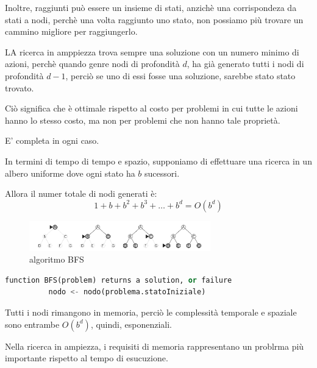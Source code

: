\documentclass[a4paper, 12pt]{book}
\begin{document}
    Inoltre, raggiunti può essere un insieme di stati, anzichè una corrispondeza da stati a nodi, perchè una volta raggiunto uno stato, non possiamo più trovare un cammino migliore per raggiungerlo.

    LA ricerca in amppiezza trova sempre una soluzione con un numero minimo di azioni, perchè quando genre nodi di profondità $d$, ha già generato tutti i nodi di profondità $d - 1$, perciò se uno di essi fosse una soluzione, sarebbe stato stato trovato.

    Ciò significa che è ottimale rispetto al costo per problemi in cui tutte le azioni hanno lo stesso costo, ma non per problemi che non hanno tale proprietà.

    E' completa in ogni caso.

    In termini di tempo di tempo e spazio, supponiamo di effettuare una ricerca in un albero uniforme dove ogni stato ha $b$ sucessori.

    Allora il numer totale di nodi generati è:
    \begin{equation*}
      1 + b + b^2 + b^3 + \dots + b^d = O(b^d)
    \end{equation*}

    \begin{figure}[H]
      \centering
      \includegraphics[width=0.7\textwidth, keepaspectratio]{foto/ricercaInAmpiezza.jpeg}
      \caption{algoritmo BFS}
    \end{figure}


    \begin{example}
      \begin{lstlisting}[language=Python, breaklines=true, linewidth=\linewidth]
        function BFS(problem) returns a solution, or failure
          nodo <- nodo(problema.statoIniziale)
      \end{lstlisting}
    \end{example}

    Tutti i nodi rimangono in memoria, perciò le complessità temporale e spaziale sono entrambe $O(b^d)$, quindi, esponenziali.
    
    Nella ricerca in ampiezza, i requisiti di memoria rappresentano un problrma più importante rispetto al tempo di esucuzione.
\end{document}
